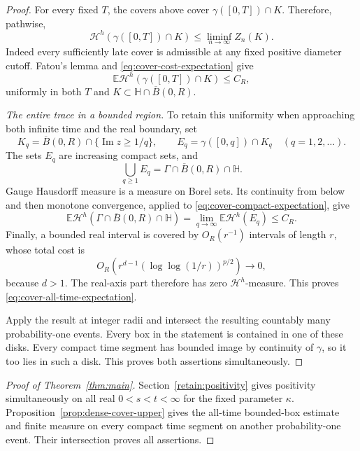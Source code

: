 \begin{proof}
For every fixed \(T\), the covers above cover
\(\gamma([0,T])\cap K\).  Therefore, pathwise,
\[
 \mathcal H^h(\gamma([0,T])\cap K)
       \le\liminf_{n\to\infty}Z_n(K).
\]
Indeed every sufficiently late cover is admissible at any
fixed positive diameter cutoff.  Fatou's lemma and
\eqref{eq:cover-cost-expectation} give
\begin{equation}
 \mathbb E\mathcal H^h(\gamma([0,T])\cap K)\le C_R,
 \label{eq:cover-compact-expectation}
\end{equation}
uniformly in both \(T\) and \(K\subset\mathbb H\cap\overline B(0,R)\).

\emph{The entire trace in a bounded region.}
To retain this uniformity when approaching both infinite time
and the real boundary, set
\[
 K_q=\overline B(0,R)\cap\{\operatorname{Im}z\ge1/q\},
 \qquad E_q=\gamma([0,q])\cap K_q
       \quad(q=1,2,\ldots).
\]
The sets \(E_q\) are increasing compact sets, and
\[
 \bigcup_{q\ge1}E_q=\Gamma\cap\overline B(0,R)\cap\mathbb H.
\]
Gauge Hausdorff measure is a measure on Borel sets.  Its
continuity from below and then monotone convergence, applied
to \eqref{eq:cover-compact-expectation}, give
\[
 \mathbb E\mathcal H^h
       (\Gamma\cap\overline B(0,R)\cap\mathbb H)
    =\lim_{q\to\infty}\mathbb E\mathcal H^h(E_q)
    \le C_R.
\]
Finally, a bounded real interval is covered by \(O_R(r^{-1})\)
intervals of length \(r\), whose total cost is
\[
 O_R\!\left(r^{d-1}(\log\log(1/r))^{p/2}\right)\longrightarrow0,
\]
because \(d>1\).  The real-axis part therefore has zero
\(\mathcal H^h\)-measure.  This proves
\eqref{eq:cover-all-time-expectation}.

Apply the result at integer radii and intersect the resulting
countably many probability-one events.  Every box in the
statement is contained in one of these disks.  Every compact
time segment has bounded image by continuity of \(\gamma\),
so it too lies in such a disk.  This proves both assertions
simultaneously.
\end{proof}

\begin{proof}[Proof of Theorem~\ref{thm:main}]
Section~\ref{retain:positivity} gives positivity simultaneously on all real
$0<s<t<\infty$ for the fixed parameter $\kappa$.
Proposition~\ref{prop:dense-cover-upper} gives the all-time bounded-box
estimate and finite measure on every compact time segment on another
probability-one event. Their intersection proves all assertions.
\end{proof}

